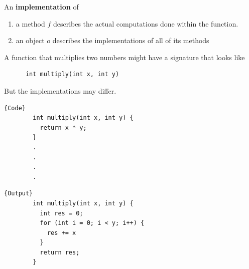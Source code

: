   \begin{definition}[Implementation]
    An \textbf{implementation} of 
    \begin{enumerate}
      \item a method $f$ describes the actual computations done within the function. 
      \item an object $o$ describes the implementations of all of its methods
    \end{enumerate}
  \end{definition}

  \begin{example}[Multiplication]
    A function that multiplies two numbers might have a signature that looks like
    \begin{lstlisting}
      int multiply(int x, int y)
    \end{lstlisting} 
    But the implementations may differ. 
    
    \noindent\begin{minipage}{.5\textwidth}
      \begin{lstlisting}[]{Code}
        int multiply(int x, int y) {
          return x * y;
        }
        .
        .
        .
        .
      \end{lstlisting}
      \end{minipage}
      \hfill
      \begin{minipage}{.49\textwidth}
      \begin{lstlisting}[]{Output}
        int multiply(int x, int y) {
          int res = 0; 
          for (int i = 0; i < y; i++) {
            res += x
          } 
          return res;
        }
      \end{lstlisting}
    \end{minipage}
  \end{example} 

